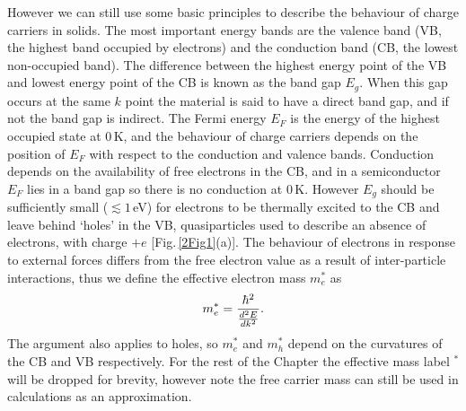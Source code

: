 However we can still use some basic principles to describe the behaviour of charge carriers in solids. The most important energy bands are the valence band (VB, the highest band occupied by electrons) and the conduction band (CB, the lowest non-occupied band). The difference between the highest energy point of the VB and lowest energy point of the CB is known as the band gap $E_g$. When this gap occurs at the same $k$ point the material is said to have a direct band gap, and if not the band gap is indirect. The Fermi energy $E_F$ is the energy of the highest occupied state at 0\,K, and the behaviour of charge carriers depends on the position of $E_F$ with respect to the conduction and valence bands. Conduction depends on the availability of free electrons in the CB, and in a semiconductor $E_F$ lies in a band gap so there is no conduction at 0\,K. However $E_g$ should be sufficiently small ($\lesssim1$\,eV) for electrons to be thermally excited to the CB and leave behind `holes' in the VB, quasiparticles used to describe an absence of electrons, with charge $+e$ [Fig.\,\ref{2Fig1}(a)]. The behaviour of electrons in response to external forces differs from the free electron value as a result of inter-particle interactions, thus we define the effective electron mass $m_e^*$ as
\begin{equation}
\centering
m_e^{*} = \frac{\hbar^2}{\frac{d^2E}{dk^2}} .
\label{effectivemass}
\end{equation}
The argument also applies to holes, so $m_e^*$ and $m_h^*$ depend on the curvatures of the CB and VB respectively. For the rest of the Chapter the effective mass label $^*$ will be dropped for brevity, however note the free carrier mass can still be used in calculations as an approximation.

